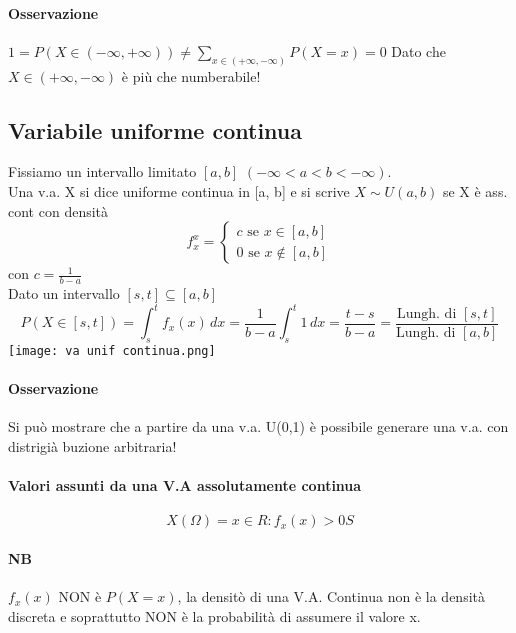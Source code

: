  \paragraph*{Osservazione} $1 = P(X \in (-\infty, +\infty)) 
 \neq \sum_{x \in (+\infty, -\infty)} P (X = x) = 0$ Dato che $X \in (+\infty, -\infty)$
 è più che numberabile!
 
\subsection{Variabile uniforme continua}
Fissiamo un intervallo limitato $[a, b]$ $(-\infty < a < b < -\infty)$.
\\ Una v.a. X si dice uniforme continua in [a, b] e si scrive $X \sim U(a, b)$
se X è ass. cont con densità
\begin{equation*}
    f_x^{x} =
    \begin{cases}
        c \text{ se } x \in [a, b]\\
        0 \text{ se } x \notin [a, b]
    \end{cases} 
\end{equation*}
con $c = \frac{1}{b-a}$
\\ Dato un intervallo $[s, t] \subseteq [a, b]$
\begin{equation*}
    P(X \in [s,t]) = \int_s^t f_x (x) \,dx = 
    \frac{1}{b -a} \int_s^t 1 \,dx = \frac{t-s}{b-a} =
    \frac{\text{Lungh. di } [s,t]}{\text{Lungh. di } [a, b]}
\end{equation*} 
\texttt{[image: va unif continua.png]}
\paragraph*{Osservazione} Si può mostrare che a partire da una v.a. U(0,1) è possibile
generare una v.a. con distrigià buzione arbitraria!

\paragraph*{Valori assunti da una V.A assolutamente continua}
\begin{equation*}
    X(\Omega) = {x \in R: f_x(x) > 0S}
\end{equation*}

\paragraph{NB} $f_x(x)$ NON è $P(X=x)$, la densitò di una V.A. Continua non è la densità discreta 
e soprattutto NON è la probabilità di assumere il valore x.

